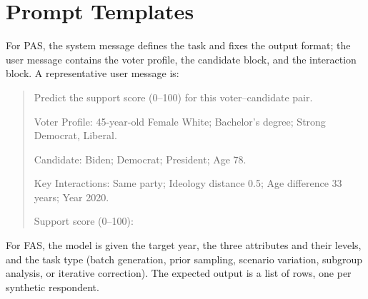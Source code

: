 \begin{table}[h]
\centering
\small
{}
\caption{Bootstrap 95\% CIs from 1,000 resamples of the generated or
prior-sampled rows. The empirical 2024 sample is treated as fixed.}
\label{tab:fas_ci}
\end{table}

\section{Prompt Templates}

For PAS, the system message defines the task and fixes the output format; the
user message contains the voter profile, the candidate block, and the interaction
block. A representative user message is:

\begin{quote}\small
Predict the support score (0--100) for this voter--candidate pair.

Voter Profile: 45-year-old Female White; Bachelor's degree; Strong Democrat,
Liberal.

Candidate: Biden; Democrat; President; Age 78.

Key Interactions: Same party; Ideology distance 0.5; Age difference 33 years;
Year 2020.

Support score (0--100):
\end{quote}

For FAS, the model is given the target year, the three attributes and their
levels, and the task type (batch generation, prior sampling, scenario variation,
subgroup analysis, or iterative correction). The expected output is a list of
rows, one per synthetic respondent.

